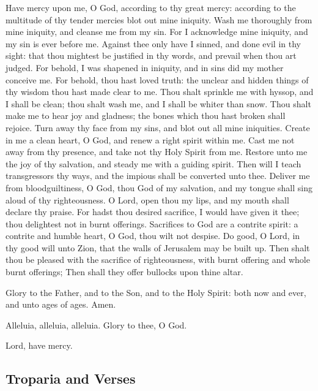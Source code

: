 Have mercy upon me, O God, according to thy great mercy: according to the multitude of thy tender mercies blot out mine iniquity. Wash me thoroughly from mine iniquity, and cleanse me from my sin. For I acknowledge mine iniquity, and my sin is ever before me. Against thee only have I sinned, and done evil in thy sight: that thou mightest be justified in thy words, and prevail when thou art judged. For behold, I was shapened in iniquity, and in sins did my mother conceive me.  For behold, thou hast loved truth: the unclear and hidden things of thy wisdom thou hast made clear to me. Thou shalt sprinkle me with hyssop, and I shall be clean; thou shalt wash me, and I shall be whiter than snow. Thou shalt make me to hear joy and gladness; the bones which thou hast broken shall rejoice. Turn away thy face from my sins, and blot out all mine iniquities. Create in me a clean heart, O God, and renew a right spirit within me. Cast me not away from thy presence, and take not thy Holy Spirit from me. Restore unto me the joy of thy salvation, and steady me with a guiding spirit.  Then will I teach transgressors thy ways, and the impious shall be converted unto thee. Deliver me from bloodguiltiness, O God, thou God of my salvation, and my tongue shall sing aloud of thy righteousness. O Lord, open thou my lips, and my mouth shall declare thy praise. For hadst thou desired sacrifice, I would have given it thee; thou delightest not in burnt offerings. Sacrifices to God are a contrite spirit: a contrite and humble heart, O God, thou wilt not despise. Do good, O Lord, in thy good will unto Zion, that the walls of Jerusalem may be built up. Then shalt thou be pleased with the sacrifice of righteousness, with burnt offering and whole burnt offerings; Then shall they offer bullocks upon thine altar.

Glory to the Father, and to the Son, and to the Holy Spirit: both now and ever, and unto ages of ages. Amen.

Alleluia, alleluia, alleluia. Glory to thee, O God. 

Lord, have mercy. 

\subsection{Troparia and Verses}


